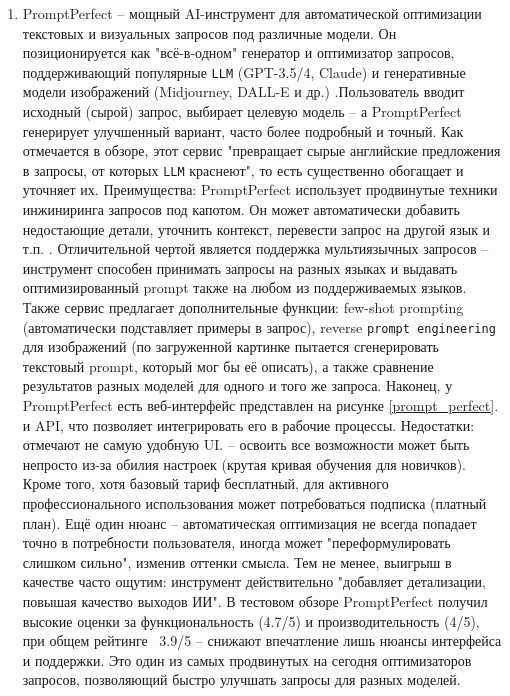 \begin{enumerate}[label=\arabic*]
\begin{figure}[htbp]
\end{figure}
\item  PromptPerfect – мощный AI-инструмент для автоматической оптимизации текстовых и визуальных запросов под различные модели. Он позиционируется как "всё-в-одном" генератор и оптимизатор запросов, поддерживающий популярные \texttt{LLM} (GPT-3.5/4, Claude) и генеративные модели изображений (Midjourney, DALL-E и др.) \cite{dhruvirzala:promptperfect}.Пользователь вводит исходный (сырой) запрос, выбирает целевую модель – а PromptPerfect генерирует улучшенный вариант, часто более подробный и точный. Как отмечается в обзоре, этот сервис "превращает сырые английские предложения в запросы, от которых \texttt{LLM} краснеют", то есть существенно обогащает и уточняет их.  Преимущества: PromptPerfect использует продвинутые техники инжиниринга запросов под капотом. Он может автоматически добавить недостающие детали, уточнить контекст, перевести запрос на другой язык и т.п. \cite{dhruvirzala:promptperfect}. Отличительной чертой является поддержка мультиязычных запросов – инструмент способен принимать запросы на разных языках и выдавать оптимизированный prompt также на любом из поддерживаемых языков. Также сервис предлагает дополнительные функции: few-shot prompting (автоматически подставляет примеры в запрос), reverse \texttt{prompt engineering} для изображений (по загруженной картинке пытается сгенерировать текстовый prompt, который мог бы её описать), а также сравнение результатов разных моделей для одного и того же запроса. Наконец, у PromptPerfect есть веб-интерфейс представлен на рисунке \ref{prompt_perfect}. и API, что позволяет интегрировать его в рабочие процессы. Недостатки: отмечают не самую удобную UI\cite{dhruvirzala:promptperfect}. – освоить все возможности может быть непросто из-за обилия настроек (крутая кривая обучения для новичков). Кроме того, хотя базовый тариф бесплатный, для активного профессионального использования может потребоваться подписка (платный план). Ещё один нюанс – автоматическая оптимизация не всегда попадает точно в потребности пользователя, иногда может "переформулировать слишком сильно", изменив оттенки смысла. Тем не менее, выигрыш в качестве часто ощутим: инструмент действительно "добавляет детализации, повышая качество выходов ИИ"\cite{dhruvirzala:promptperfect}. В тестовом обзоре PromptPerfect получил высокие оценки за функциональность (4.7/5) и производительность (4/5), при общем рейтинге ~3.9/5 – снижают впечатление лишь нюансы интерфейса и поддержки. Это один из самых продвинутых на сегодня оптимизаторов запросов, позволяющий быстро улучшать запросы для разных моделей. 

\end{enumerate}
